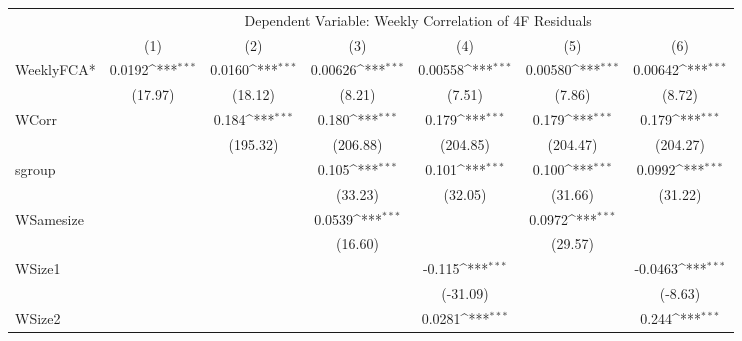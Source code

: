 {
\def\sym#1{\ifmmode^{#1}\else\(^{#1}\)\fi}
\begin{tabular}{l*{6}{c}}
\hline\hline
 & \multicolumn{6}{c}{Dependent Variable: Weekly Correlation of 4F Residuals}                 \\
 \cline{2-7}
                    &\multicolumn{1}{c}{(1)}         &\multicolumn{1}{c}{(2)}         &\multicolumn{1}{c}{(3)}         &\multicolumn{1}{c}{(4)}         &\multicolumn{1}{c}{(5)}         &\multicolumn{1}{c}{(6)}         \\
\hline
WeeklyFCA*          &      0.0192\sym{***}&      0.0160\sym{***}&     0.00626\sym{***}&     0.00558\sym{***}&     0.00580\sym{***}&     0.00642\sym{***}\\
                    &     (17.97)         &     (18.12)         &      (8.21)         &      (7.51)         &      (7.86)         &      (8.72)         \\
[1em]
WCorr               &                     &       0.184\sym{***}&       0.180\sym{***}&       0.179\sym{***}&       0.179\sym{***}&       0.179\sym{***}\\
                    &                     &    (195.32)         &    (206.88)         &    (204.85)         &    (204.47)         &    (204.27)         \\
[1em]
sgroup              &                     &                     &       0.105\sym{***}&       0.101\sym{***}&       0.100\sym{***}&      0.0992\sym{***}\\
                    &                     &                     &     (33.23)         &     (32.05)         &     (31.66)         &     (31.22)         \\
[1em]
WSamesize           &                     &                     &      0.0539\sym{***}&                     &      0.0972\sym{***}&                     \\
                    &                     &                     &     (16.60)         &                     &     (29.57)         &                     \\
[1em]
WSize1              &                     &                     &                     &      -0.115\sym{***}&                     &     -0.0463\sym{***}\\
                    &                     &                     &                     &    (-31.09)         &                     &     (-8.63)         \\
[1em]
WSize2              &                     &                     &                     &      0.0281\sym{***}&                     &       0.244\sym{***}\\

\end{tabular}}
